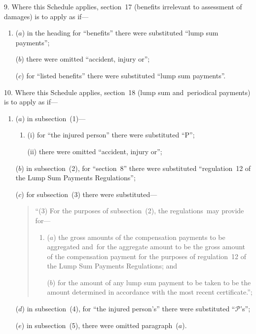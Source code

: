 \documentclass[12pt,a4paper]{article}
\begin{document}
\medskip

9.  Where this Schedule applies, section~17 (benefits irrelevant to assessment of damages) is to apply as if—
\begin{enumerate}\item[]
($a$) in the heading for “benefits” there were substituted “lump sum payments”;

($b$) there were omitted “accident, injury or”;

($c$) for “listed benefits” there were substituted “lump sum payments”.
\end{enumerate}

\medskip

10.  Where this Schedule applies, section~18 (lump sum and~periodical payments) is to apply as if—
\begin{enumerate}\item[]
($a$) in subsection~(1)—
\begin{enumerate}\item[]
(i) for “the injured person” there were substituted “P”;

(ii) there were omitted “accident, injury or”;
\end{enumerate}

($b$) in subsection~(2), for “section~8” there were substituted “regulation~12 of the Lump Sum Payments Regulations”;

($c$) for subsection~(3) there were substituted—
\begin{quotation}
“(3) For the purposes of subsection~(2), the regulations~may provide for—
\begin{enumerate}\item[]
($a$) the gross amounts of the compensation payments to be aggregated and~for the aggregate amount to be the gross amount of the compensation payment for the purposes of regulation~12 of the Lump Sum Payments Regulations; and

($b$) for the amount of any lump sum payment to be taken to be the amount determined in accordance with the most recent certificate.”;
\end{enumerate}
\end{quotation}

($d$) in subsection~(4), for “the injured person’s” there were substituted “$\mathcal{P}$’s”;

($e$) in subsection~(5), there were omitted paragraph~($a$).
\end{enumerate}

\medskip
\end{document}
